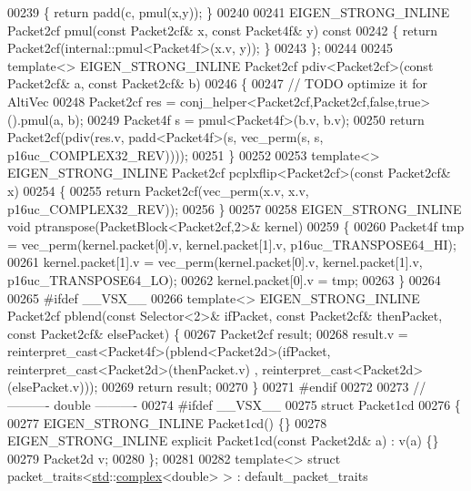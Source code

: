 \begin{DoxyCode}
00239 \textcolor{keyword}{  }\{ \textcolor{keywordflow}{return} padd(c, pmul(x,y)); \}
00240 
00241   EIGEN\_STRONG\_INLINE Packet2cf pmul(\textcolor{keyword}{const} Packet2cf& x, \textcolor{keyword}{const} Packet4f& y)\textcolor{keyword}{ const}
00242 \textcolor{keyword}{  }\{ \textcolor{keywordflow}{return} Packet2cf(internal::pmul<Packet4f>(x.v, y)); \}
00243 \};
00244 
00245 \textcolor{keyword}{template}<> EIGEN\_STRONG\_INLINE Packet2cf pdiv<Packet2cf>(\textcolor{keyword}{const} Packet2cf& a, \textcolor{keyword}{const} Packet2cf& b)
00246 \{
00247   \textcolor{comment}{// TODO optimize it for AltiVec}
00248   Packet2cf res = conj\_helper<Packet2cf,Packet2cf,false,true>().pmul(a, b);
00249   Packet4f s = pmul<Packet4f>(b.v, b.v);
00250   \textcolor{keywordflow}{return} Packet2cf(pdiv(res.v, padd<Packet4f>(s, vec\_perm(s, s, p16uc\_COMPLEX32\_REV))));
00251 \}
00252 
00253 \textcolor{keyword}{template}<> EIGEN\_STRONG\_INLINE Packet2cf pcplxflip<Packet2cf>(\textcolor{keyword}{const} Packet2cf& x)
00254 \{
00255   \textcolor{keywordflow}{return} Packet2cf(vec\_perm(x.v, x.v, p16uc\_COMPLEX32\_REV));
00256 \}
00257 
00258 EIGEN\_STRONG\_INLINE \textcolor{keywordtype}{void} ptranspose(PacketBlock<Packet2cf,2>& kernel)
00259 \{
00260   Packet4f tmp = vec\_perm(kernel.packet[0].v, kernel.packet[1].v, p16uc\_TRANSPOSE64\_HI);
00261   kernel.packet[1].v = vec\_perm(kernel.packet[0].v, kernel.packet[1].v, p16uc\_TRANSPOSE64\_LO);
00262   kernel.packet[0].v = tmp;
00263 \}
00264 
00265 \textcolor{preprocessor}{#ifdef \_\_VSX\_\_}
00266 \textcolor{keyword}{template}<> EIGEN\_STRONG\_INLINE Packet2cf pblend(\textcolor{keyword}{const} Selector<2>& ifPacket, \textcolor{keyword}{const} Packet2cf& thenPacket, \textcolor{keyword}{
      const} Packet2cf& elsePacket) \{
00267   Packet2cf result;
00268   result.v = \textcolor{keyword}{reinterpret\_cast<}Packet4f\textcolor{keyword}{>}(pblend<Packet2d>(ifPacket, \textcolor{keyword}{reinterpret\_cast<}Packet2d\textcolor{keyword}{>}(thenPacket.v)
      , reinterpret\_cast<Packet2d>(elsePacket.v)));
00269   \textcolor{keywordflow}{return} result;
00270 \}
00271 \textcolor{preprocessor}{#endif}
00272 
00273 \textcolor{comment}{//---------- double ----------}
00274 \textcolor{preprocessor}{#ifdef \_\_VSX\_\_}
00275 \textcolor{keyword}{struct }Packet1cd
00276 \{
00277   EIGEN\_STRONG\_INLINE Packet1cd() \{\}
00278   EIGEN\_STRONG\_INLINE \textcolor{keyword}{explicit} Packet1cd(\textcolor{keyword}{const} Packet2d& a) : v(a) \{\}
00279   Packet2d v;
00280 \};
00281 
00282 \textcolor{keyword}{template}<> \textcolor{keyword}{struct }packet\_traits<\hyperlink{namespacestd}{std}::\hyperlink{structcomplex}{complex}<double> >  : default\_packet\_traits

\end{DoxyCode}
